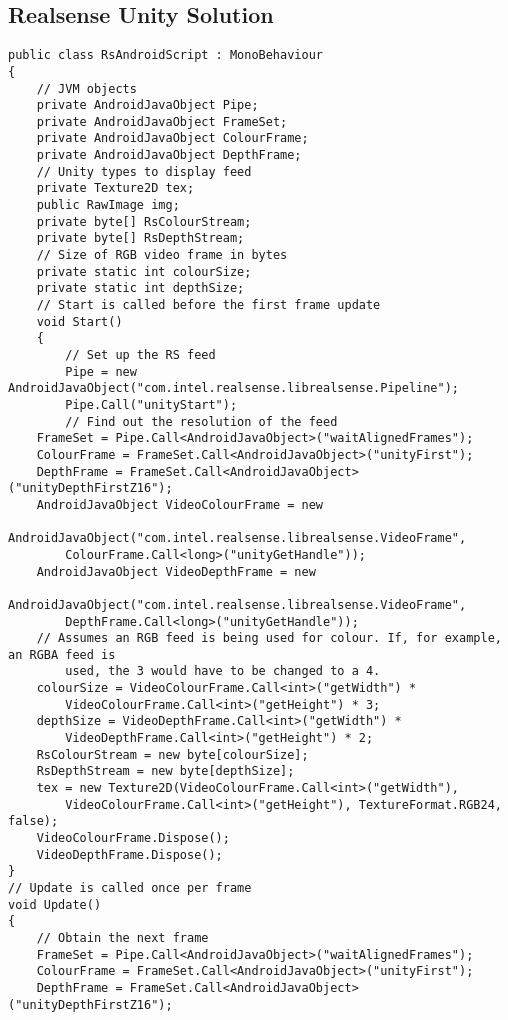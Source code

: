\begin{appendices}
    \section{Realsense Unity Solution}
    \label{appendix:rsunitysol}
    \begin{lstlisting}[style=CSharpStyle]
public class RsAndroidScript : MonoBehaviour
{
    // JVM objects
    private AndroidJavaObject Pipe;
    private AndroidJavaObject FrameSet;
    private AndroidJavaObject ColourFrame;
    private AndroidJavaObject DepthFrame;
    // Unity types to display feed
    private Texture2D tex;
    public RawImage img;
    private byte[] RsColourStream;
    private byte[] RsDepthStream;
    // Size of RGB video frame in bytes
    private static int colourSize;
    private static int depthSize;
    // Start is called before the first frame update
    void Start()
    {
        // Set up the RS feed
        Pipe = new AndroidJavaObject("com.intel.realsense.librealsense.Pipeline");
        Pipe.Call("unityStart");
        // Find out the resolution of the feed
    FrameSet = Pipe.Call<AndroidJavaObject>("waitAlignedFrames");
    ColourFrame = FrameSet.Call<AndroidJavaObject>("unityFirst");
    DepthFrame = FrameSet.Call<AndroidJavaObject>("unityDepthFirstZ16");
    AndroidJavaObject VideoColourFrame = new
        AndroidJavaObject("com.intel.realsense.librealsense.VideoFrame",
        ColourFrame.Call<long>("unityGetHandle"));
    AndroidJavaObject VideoDepthFrame = new
        AndroidJavaObject("com.intel.realsense.librealsense.VideoFrame",
        DepthFrame.Call<long>("unityGetHandle"));
    // Assumes an RGB feed is being used for colour. If, for example, an RGBA feed is
        used, the 3 would have to be changed to a 4.
    colourSize = VideoColourFrame.Call<int>("getWidth") *
        VideoColourFrame.Call<int>("getHeight") * 3;
    depthSize = VideoDepthFrame.Call<int>("getWidth") *
        VideoDepthFrame.Call<int>("getHeight") * 2;
    RsColourStream = new byte[colourSize];
    RsDepthStream = new byte[depthSize];
    tex = new Texture2D(VideoColourFrame.Call<int>("getWidth"),
        VideoColourFrame.Call<int>("getHeight"), TextureFormat.RGB24, false);
    VideoColourFrame.Dispose();
    VideoDepthFrame.Dispose();
}
// Update is called once per frame
void Update()
{
    // Obtain the next frame
    FrameSet = Pipe.Call<AndroidJavaObject>("waitAlignedFrames");
    ColourFrame = FrameSet.Call<AndroidJavaObject>("unityFirst");
    DepthFrame = FrameSet.Call<AndroidJavaObject>("unityDepthFirstZ16");

\end{lstlisting}
\end{appendices}
